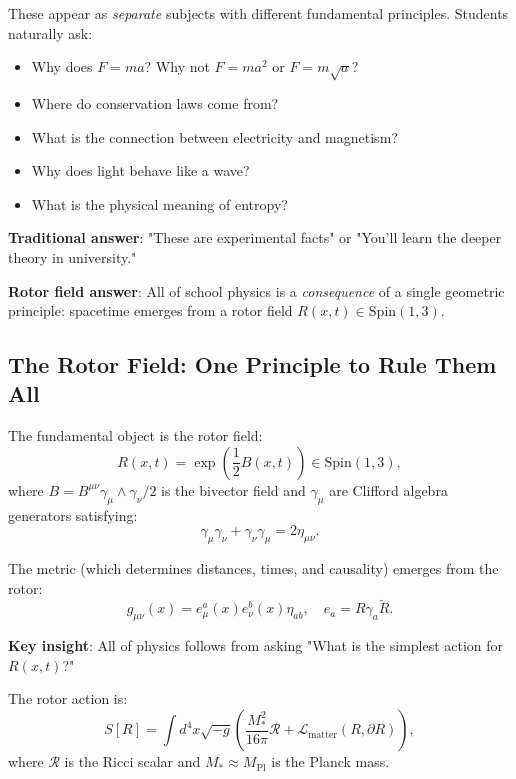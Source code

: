 \documentclass[12pt,a4paper]{article}
\theoremstyle{definition}
\theoremstyle{remark}
\begin{document}
These appear as \emph{separate} subjects with different fundamental principles. Students naturally ask:
\begin{itemize}
\item Why does $F = ma$? Why not $F = ma^2$ or $F = m\sqrt{a}$?
\item Where do conservation laws come from?
\item What is the connection between electricity and magnetism?
\item Why does light behave like a wave?
\item What is the physical meaning of entropy?
\end{itemize}

\textbf{Traditional answer}: "These are experimental facts" or "You'll learn the deeper theory in university."

\textbf{Rotor field answer}: All of school physics is a \emph{consequence} of a single geometric principle: spacetime emerges from a rotor field $R(x,t) \in \mathrm{Spin}(1,3)$.

\subsection{The Rotor Field: One Principle to Rule Them All}

The fundamental object is the rotor field:
\begin{equation}
R(x,t) = \exp\left(\frac{1}{2} B(x,t)\right) \in \mathrm{Spin}(1,3),
\end{equation}
where $B = B^{\mu\nu} \gamma_\mu \wedge \gamma_\nu / 2$ is the bivector field and $\gamma_\mu$ are Clifford algebra generators satisfying:
\begin{equation}
\gamma_\mu \gamma_\nu + \gamma_\nu \gamma_\mu = 2\eta_{\mu\nu}.
\end{equation}

The metric (which determines distances, times, and causality) emerges from the rotor:
\begin{equation}
g_{\mu\nu}(x) = e_\mu^a(x) e_\nu^b(x) \eta_{ab}, \quad e_a = R \gamma_a \tilde{R}.
\end{equation}

\textbf{Key insight}: All of physics follows from asking "What is the simplest action for $R(x,t)$?"

The rotor action is:
\begin{equation}
S[R] = \int d^4x \sqrt{-g} \left( \frac{M_*^2}{16\pi} \mathcal{R} + \mathcal{L}_{\text{matter}}(R, \partial R) \right),
\end{equation}
where $\mathcal{R}$ is the Ricci scalar and $M_* \approx M_{\text{Pl}}$ is the Planck mass.
\end{document}
